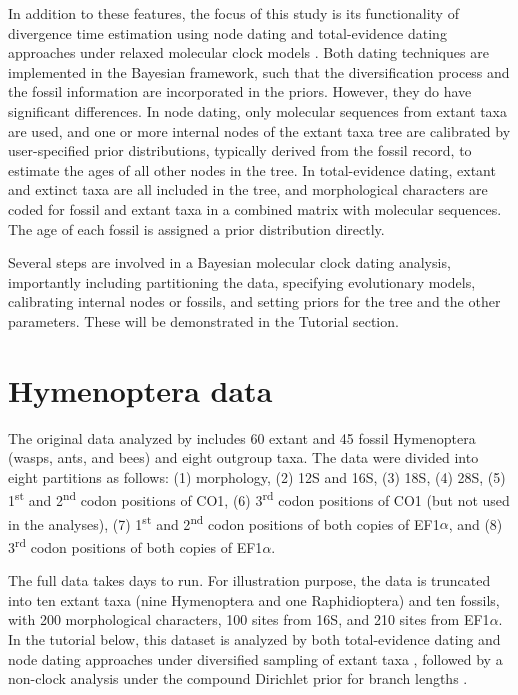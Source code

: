 \documentclass[12pt]{article}
\begin{document}
In addition to these features, the focus of this study is its functionality of divergence time estimation using node dating \citep[e.g.,][]{Yang:2006eu, Ho:2009gn} and total-evidence dating \citep{Ronquist:2012ea, Zhang:2016kf} approaches under relaxed molecular clock models \citep{Huelsenbeck:2000ic, Thorne:2002il, Drummond:2006kt, Lepage:2007bq}.
Both dating techniques are implemented in the Bayesian framework, such that the diversification process and the fossil information are incorporated in the priors.
However, they do have significant differences.
In node dating, only molecular sequences from extant taxa are used, and one or more internal nodes of the extant taxa tree are calibrated by user-specified prior distributions, typically derived from the fossil record, to estimate the ages of all other nodes in the tree.
In total-evidence dating, extant and extinct taxa are all included in the tree, and morphological characters are coded for fossil and extant taxa in a combined matrix with molecular sequences.
The age of each fossil is assigned a prior distribution directly.

Several steps are involved in a Bayesian molecular clock dating analysis, importantly including partitioning the data, specifying evolutionary models, calibrating internal nodes or fossils, and setting priors for the tree and the other parameters.
These will be demonstrated in the Tutorial section.

\section{Hymenoptera data}

The original data analyzed by \citet{Ronquist:2012ea, Zhang:2016kf} includes 60 extant and 45 fossil Hymenoptera (wasps, ants, and bees) and eight outgroup taxa.
The data were divided into eight partitions as follows: (1) morphology, (2) 12S and 16S, (3) 18S, (4) 28S, (5) 1\textsuperscript{st} and 2\textsuperscript{nd} codon positions of CO1, (6) 3\textsuperscript{rd} codon positions of CO1 (but not used in the analyses), (7) 1\textsuperscript{st} and 2\textsuperscript{nd} codon positions of both copies of EF1$\alpha$, and (8) 3\textsuperscript{rd}  codon positions of both copies of EF1$\alpha$.

The full data takes days to run. For illustration purpose, the data is truncated into ten extant taxa (nine Hymenoptera and one Raphidioptera) and ten fossils, with 200 morphological characters, 100 sites from 16S, and 210 sites from EF1$\alpha$.
In the tutorial below, this dataset is analyzed by both total-evidence dating and node dating approaches under diversified sampling of extant taxa \citep{Hohna:2011hd, Zhang:2016kf}, followed by a non-clock analysis under the compound Dirichlet prior for branch lengths \citep{Rannala:2012ke, Zhang:2012ke}.
\end{document}
